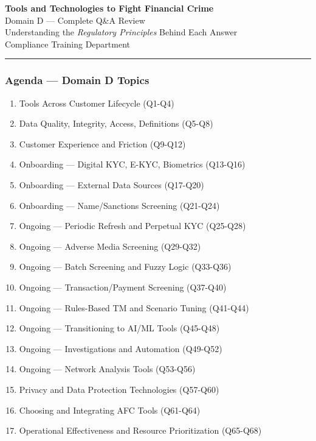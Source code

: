 \documentclass[12pt,aspectratio=169]{beamer}
\renewcommand{\scriptsize}{\fontsize{5}{6}\selectfont}
\begin{document}
	
	\begin{frame}
		\centering
		\vspace{0.8cm}
		{\fontsize{16}{19}\selectfont \textbf{Tools and Technologies to Fight Financial Crime}}\\[0.15cm]
		{\fontsize{12}{14}\selectfont Domain D — Complete Q\&A Review}\\[0.3cm]
		{\fontsize{9}{11}\selectfont Understanding the \textit{Regulatory Principles} Behind Each Answer}\\[0.3cm]
		{\fontsize{8}{10}\selectfont Compliance Training Department}
		\vspace{0.2cm}
		\rule{4cm}{0.5pt}
	\end{frame}
	
	\begin{frame}
		\frametitle{\fontsize{11}{13}\selectfont Agenda — Domain D Topics}
		\scriptsize
		\begin{enumerate}
			\item Tools Across Customer Lifecycle (Q1-Q4)
			\item Data Quality, Integrity, Access, Definitions (Q5-Q8)
			\item Customer Experience and Friction (Q9-Q12)
			\item Onboarding — Digital KYC, E-KYC, Biometrics (Q13-Q16)
			\item Onboarding — External Data Sources (Q17-Q20)
			\item Onboarding — Name/Sanctions Screening (Q21-Q24)
			\item Ongoing — Periodic Refresh and Perpetual KYC (Q25-Q28)
			\item Ongoing — Adverse Media Screening (Q29-Q32)
			\item Ongoing — Batch Screening and Fuzzy Logic (Q33-Q36)
			\item Ongoing — Transaction/Payment Screening (Q37-Q40)
			\item Ongoing — Rules-Based TM and Scenario Tuning (Q41-Q44)
			\item Ongoing — Transitioning to AI/ML Tools (Q45-Q48)
			\item Ongoing — Investigations and Automation (Q49-Q52)
			\item Ongoing — Network Analysis Tools (Q53-Q56)
			\item Privacy and Data Protection Technologies (Q57-Q60)
			\item Choosing and Integrating AFC Tools (Q61-Q64)
			\item Operational Effectiveness and Resource Prioritization (Q65-Q68)
		\end{enumerate}
	\end{frame}
	
\end{document}
